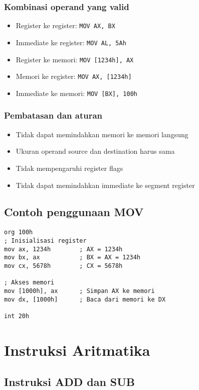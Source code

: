 \subsubsection{Kombinasi operand yang valid}
\begin{itemize}
    \item Register ke register: \texttt{MOV AX, BX}
    \item Immediate ke register: \texttt{MOV AL, 5Ah}
    \item Register ke memori: \texttt{MOV [1234h], AX}
    \item Memori ke register: \texttt{MOV AX, [1234h]}
    \item Immediate ke memori: \texttt{MOV [BX], 100h}
\end{itemize}

\subsubsection{Pembatasan dan aturan}
\begin{itemize}
    \item Tidak dapat memindahkan memori ke memori langsung
    \item Ukuran operand source dan destination harus sama
    \item Tidak mempengaruhi register flags
    \item Tidak dapat memindahkan immediate ke segment register
\end{itemize}

\subsection{Contoh penggunaan MOV}
\begin{verbatim}
org 100h
; Inisialisasi register
mov ax, 1234h        ; AX = 1234h
mov bx, ax           ; BX = AX = 1234h
mov cx, 5678h        ; CX = 5678h

; Akses memori
mov [1000h], ax      ; Simpan AX ke memori
mov dx, [1000h]      ; Baca dari memori ke DX

int 20h
\end{verbatim}

\section{Instruksi Aritmatika}\label{sec:instruksi-dasar-aritmatika}
\subsection{Instruksi ADD dan SUB}
